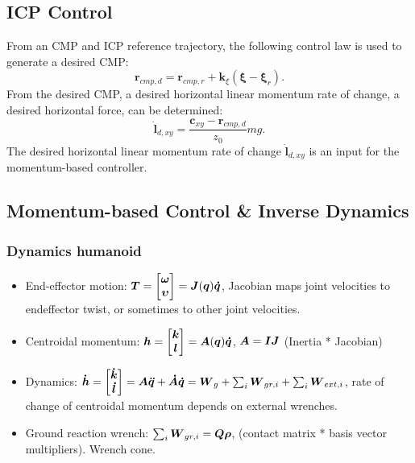 \subsection{ICP Control}
From an \ac{CMP} and \ac{ICP} reference trajectory, the following control law is used to generate a desired \ac{CMP}:
\begin{equation}
    \mathbf{r}_{cmp,d}=\mathbf{r}_{cmp,r} + \mathbf{k}_{\xi}(\mathbf{\xi}-\mathbf{\xi}_r).
\end{equation}
From the desired \ac{CMP}, a desired horizontal linear momentum rate of change, a desired horizontal force, can be determined:
\begin{equation}
    \dot{\mathbf{l}}_{d,xy} = \frac{\mathbf{c}_{xy}-\mathbf{r}_{cmp,d}}{z_0}mg.
\end{equation}
The desired horizontal linear momentum rate of change $ \dot{\mathbf{l}}_{d,xy}$ is an input for the momentum-based controller.
\subsection{Momentum-based Control \& Inverse Dynamics}
\subsubsection{Dynamics humanoid}
\begin{itemize}

    \item End-effector motion:
$\boldsymbol{T}=\begin{bmatrix}\boldsymbol{\omega} \\ \boldsymbol{\upsilon} \end{bmatrix} = \boldsymbol{J}(\boldsymbol{q})\boldsymbol{\dot{q}}$, \quad Jacobian maps joint velocities to endeffector twist, or sometimes to other joint velocities.

    \item Centroidal momentum:
$\boldsymbol{h}=\begin{bmatrix}\boldsymbol{k} \\ \boldsymbol{l} \end{bmatrix} =\boldsymbol{A}(\boldsymbol{q})\boldsymbol{\dot{q}}$, \quad $\boldsymbol{A}=\boldsymbol{I}\boldsymbol{J}$ (Inertia * Jacobian)

    \item Dynamics:
$\boldsymbol{\dot{h}}=\begin{bmatrix}\boldsymbol{\dot{k}} \\ \boldsymbol{\dot{l}} \end{bmatrix} =\boldsymbol{A}\boldsymbol{\ddot{q}} +\boldsymbol{\dot{A}}\boldsymbol{\dot{q}} = \boldsymbol{W}_g + \sum_i\boldsymbol{W}_{gr,i} + \sum_i \boldsymbol{W}_{ext,i} $, \quad rate of change of centroidal momentum depends on external wrenches.

    \item Ground reaction wrench:
$\sum_i\boldsymbol{W}_{gr,i}=\boldsymbol{Q}\boldsymbol{\rho}$, \quad (contact matrix * basis vector multipliers). Wrench cone.
\end{itemize}

